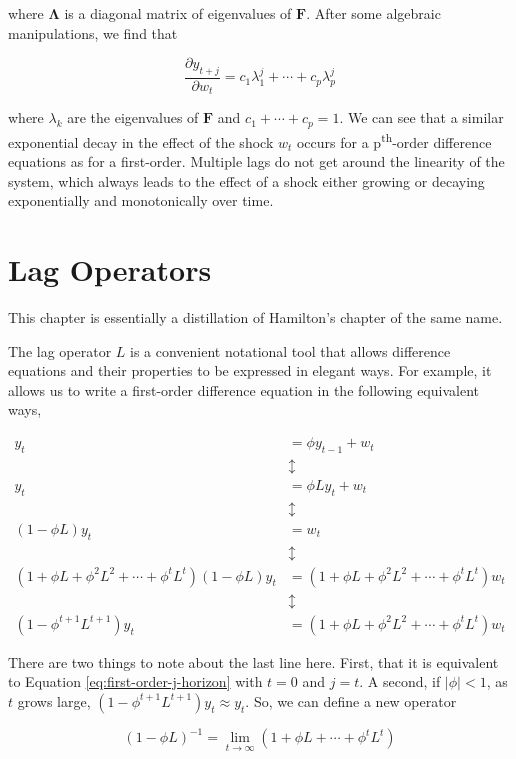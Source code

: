 \documentclass{tufte-book}
\begin{document}
\noindent where $\bm{\Lambda}$ is a diagonal matrix of eigenvalues of $\bm{F}$. After some algebraic manipulations, we find that

\[
\frac{\partial y_{t+j}}{\partial w_t} = c_1 \lambda_1^j + \cdots + c_p \lambda_p^j
\]

\noindent where $\lambda_k$ are the eigenvalues of $\bm{F}$ and $c_1 + \cdots + c_p = 1$. We can see that a similar exponential decay in the effect of the shock $w_t$ occurs for a p\textsuperscript{th}-order difference equations as for a first-order. Multiple lags do not get around the linearity of the system, which always leads to the effect of a shock either growing or decaying exponentially and monotonically over time.

\chapter{Lag Operators}

This chapter is essentially a distillation of Hamilton's \cite{hamilton1994time} chapter of the same name.

The lag operator $L$ is a convenient notational tool that allows difference equations and their properties to be expressed in elegant ways. For example, it allows us to write a first-order difference equation in the following equivalent ways,

\begin{align*}
y_t &= \phi y_{t-1} + w_t \\ 
&\updownarrow \\ 
y_t &= \phi L y_t + w_t \\ 
&\updownarrow \\ 
(1 - \phi L) y_t &= w_t \\
&\updownarrow \\ 
(1 + \phi L + \phi^2 L^2 + \cdots + \phi^t L^t)(1 - \phi L) y_t &= (1 + \phi L + \phi^2 L^2 + \cdots + \phi^t L^t)w_t \\
&\updownarrow \\ 
(1 - \phi^{t+1} L^{t+1}) y_t &= (1 + \phi L + \phi^2 L^2 + \cdots + \phi^t L^t)w_t
\end{align*}

There are two things to note about the last line here. First, that it is equivalent to Equation \ref{eq:first-order-j-horizon} with $t=0$ and $j=t$. A second, if $|\phi|<1$, as $t$ grows large, $(1 - \phi^{t+1} L^{t+1}) y_t \approx y_t$. So, we can define a new operator

\[
(1 - \phi L)^{-1} = \lim_{t \rightarrow \infty} (1 + \phi L + \cdots + \phi^t L^t)
\]
\end{document}
